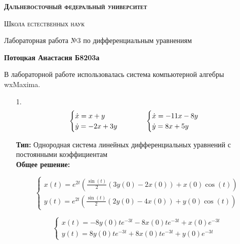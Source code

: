 \documentclass[a4paper, 12pt, oneside]{scrartcl}
\newcommand\tab[1][1cm]{\hspace*{#1}}
\begin{document}
	\begin{center}
	{\scshape\Large\bfseries Дальневосточный федеральный университет \par}
	{\scshape\Large Школа естественных наук \par}
	{\large Лабораторная работа №3 по дифференциальным уравнениям \par}
	{\large\bfseries Потоцкая Анастасия Б8203а \par}
	\end{center}
	\newcommand{\ud}{\mathrm{d}}
	В лабораторной работе использовалась система компьютерной алгебры wxMaxima. 
		\begin{enumerate}

		\item[1.] 
		\begin{equation*}
		  	\begin{cases}
   				\dot{x} = x + y \\
   				\dot{y	} = -2x + 3y 
		  	\end{cases}
		  	\tab
			\begin{cases}
				\dot{x} = -11x - 8y \\
				\dot{y} = 8x + 5y
			\end{cases}

		\end{equation*}

		\textbf{Тип: }
		Однородная система линейных  дифференциальных уравнений с постоянными коэффициентам \\
	
		\textbf{Общее решение: }

		\begin{equation*}
			\begin{cases}
			x(t)=e^{2t}( \frac{\sin(t)}{2}(3y(0)-2x(0)) + x(0)\cos(t)) \\
			y(t)=e^{2t}( \frac{\sin(t)}{2}(2y(0)-4x(0)) + y(0)\cos(t))

			\end{cases}
		\end{equation*}

		\begin{equation*}
			\begin{cases}
			x(t)=-8y(0)te^{-3t}-8x(0)te^{-3t}+x(0)e^{-3t} \\
			y(t)=8y(0)te^{-3t}+8x(0)te^{-3t}+y(0)e^{-3t}

			\end{cases}
		\end{equation*}
		

\end{enumerate}
\end{document}
